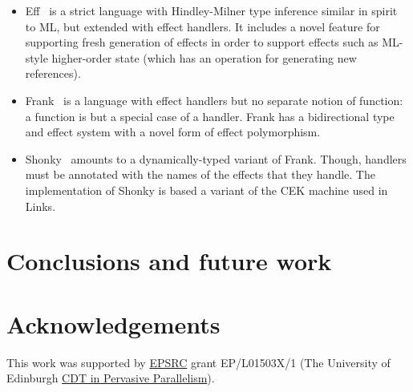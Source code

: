 \documentclass[preprint,9pt,numbers]{sigplanconf}
\begin{document}
\begin{itemize}
\item Eff~\cite{BauerP15} is a strict language with Hindley-Milner
  type inference similar in spirit to ML, but extended with effect
  handlers.
%
  It includes a novel feature for supporting fresh generation of
  effects in order to support effects such as ML-style higher-order
  state (which has an operation for generating new references).

\item Frank~\cite{LindleyMM17} is a language with effect handlers but
  no separate notion of function: a function is but a special case of
  a handler. Frank has a bidirectional type and effect system with a
  novel form of effect polymorphism.
  

\item Shonky~\cite{McBride16} amounts to a dynamically-typed variant
  of Frank. Though, handlers must be annotated with the names of the
  effects that they handle. The implementation of Shonky is based a
  variant of the CEK machine used in Links.
\end{itemize}


\section{Conclusions and future work}
\label{sec:conclusions}

\section{Acknowledgements}
This work was supported by \href{https://www.epsrc.ac.uk/}{EPSRC}
grant EP/L01503X/1 (The University of Edinburgh
\href{http://pervasiveparallelism.inf.ed.ac.uk}{CDT in Pervasive
  Parallelism}).

\nocite{*}

\softraggedright
\end{document}
